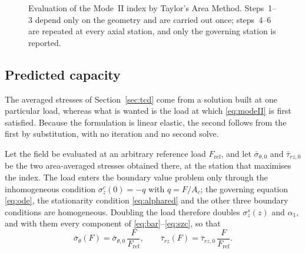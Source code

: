 \begin{figure}[H]
\caption[Area Method averaging procedure]{Evaluation of the Mode~II index by
  Taylor's Area Method. Steps~1--3 depend only on the geometry and are
  carried out once; steps~4--6 are repeated at every axial station, and only
  the governing station is reported.}
\label{fig:areamethod}
\end{figure}

\newpage
\subsection{Predicted capacity}
\label{sec:capacity}

The averaged stresses of Section~\ref{sec:tcd} come from a solution built at
one particular load, whereas what is wanted is the load at which
\eqref{eq:modeII} is first satisfied. Because the formulation is linear
elastic, the second follows from the first by substitution, with no iteration
and no second solve.
 
Let the field be evaluated at an arbitrary reference load $F_{\mathrm{ref}}$,
and let $\bar{\sigma}_{\theta,0}$ and $\bar{\tau}_{rz,0}$ be the two
area-averaged stresses obtained there, at the station that maximises the
index. The load enters the boundary value problem only through the
inhomogeneous condition $\sigma_z^{c}(0) = -q$ with $q = F/A_c$; the governing
equation \eqref{eq:ode}, the stationarity condition \eqref{eq:alphared} and
the other three boundary conditions are homogeneous. Doubling the load
therefore doubles $\sigma_z^{s}(z)$ and $\alpha_1$, and with them every
component of \eqref{eq:bar}--\eqref{eq:szc}, so that
\begin{equation}
\label{eq:propload}
\bar{\sigma}_\theta(F) = \bar{\sigma}_{\theta,0}\,\frac{F}{F_{\mathrm{ref}}},
\qquad
\bar{\tau}_{rz}(F) = \bar{\tau}_{rz,0}\,\frac{F}{F_{\mathrm{ref}}} .
\end{equation}
 

